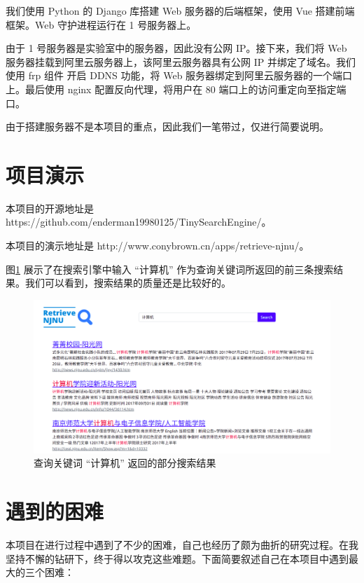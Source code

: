 \documentclass{ctexart}
\begin{document}
    我们使用 Python 的 Django 库搭建 Web 服务器的后端框架，使用 Vue 搭建前端框架。Web 守护进程运行在 1 号服务器上。

    由于 1 号服务器是实验室中的服务器，因此没有公网 IP。接下来，我们将 Web 服务器挂载到阿里云服务器上，该阿里云服务器具有公网 IP 并绑定了域名。我们使用 frp 组件\cite{github-frp} 开启 DDNS 功能，将 Web 服务器绑定到阿里云服务器的一个端口上。最后使用 nginx 配置反向代理，将用户在 80 端口上的访问重定向至指定端口。

    由于搭建服务器不是本项目的重点，因此我们一笔带过，仅进行简要说明。


    \section{项目演示}\label{sec:demo}

    本项目的开源地址是 https://github.com/enderman19980125/TinySearchEngine/。

    本项目的演示地址是 http://www.conybrown.cn/apps/retrieve-njnu/。

    图\ref{fig:demo} 展示了在搜索引擎中输入 “计算机” 作为查询关键词所返回的前三条搜索结果。我们可以看到，搜索结果的质量还是比较好的。

    \begin{figure}[t]
        \centering
        \includegraphics[width=\textwidth]{src/demo}
        \caption{查询关键词 “计算机” 返回的部分搜索结果}
        \label{fig:demo}
    \end{figure}


    \section{遇到的困难}\label{sec:difficulty}

    本项目在进行过程中遇到了不少的困难，自己也经历了颇为曲折的研究过程。在我坚持不懈的钻研下，终于得以攻克这些难题。下面简要叙述自己在本项目中遇到最大的三个困难：
\end{document}
